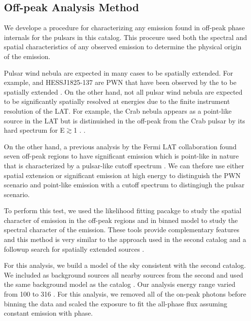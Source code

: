 \subsection{Off-peak Analysis Method}
\label{subsec:off_peak_analysis}

We develope a procedure for characterizing any emission found
in off-peak phase internals for the pulsars in this catalog.  
This proceure used both the spectral and spatial characteristics
of any observed emission to determine the physical origin of the emission.

Pulsar wind nebula are expected in many cases to be spatially
extended. For example, \velax and HESS\;J1825-137 are PWN
that have been observed by the \lat to be spatially extended
\citep{LAT_collaboration_Vela_X_2010,LAT_collaboration_HESS_J1825_2011}.
On the other hand, not all pulsar wind nebula are expected to be
significantly spatially resolved at \gev energies due to the finite
instrument resolution of the LAT. For example, the Crab nebula appears
as a point-like source in the LAT but is distinuished in the off-peak
from the Crab pulsar by its hard spectrum for E$\gtrsim$1 \gev.
\citep{LAT_collaboration_crab_2010}.

On the other hand, a previous analysis by the Fermi LAT collaboration
found seven off-peak regions to have significant emission which is
point-like in nature that is characterized by a pulsar-like cutoff
spectrum \citep{LAT_collaboration_PWNCAT_2011}.  We can thefore use
either spatial extension or significant emission at high energy to
distinguish the PWN scenario and point-like emission with a cutoff
spectrum to distingiugh the pulsar scenario.

To perform this test, we used the likelihood fitting pacakge \pointlike
to study the spatial character of emission in the off-peak regions
and \gtlike in binned model to study the spectral character of
the emission. These tools provide complementary features and this
method is very similar to the approach used in the second \lat catalog
\citep{LAT_Collaboration_2FGL_2012} and a followup search for spatially
extended sources \citep{LAT_collaboration_extended_search_2012}.

For this analysis, we build a model of the sky consistent with the
second \lat catalog. We included as background sources all
nearby sources from the second 
and used the same background model as the catalog \citep{LAT_Collaboration_2FGL_2012}.
Our analysis energy range varied from 100 \mev to 316 \gev.
For this analysis, we removed all of the on-peak photons before binning the data
and scaled the exposure to fit the all-phase flux assuming 
constant emission with phase.

